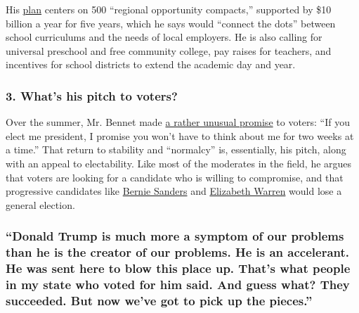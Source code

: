 His \href{https://michaelbennet.com/education/}{plan} centers on 500
``regional opportunity compacts,'' supported by \$10 billion a year for
five years, which he says would ``connect the dots'' between school
curriculums and the needs of local employers. He is also calling for
universal preschool and free community college, pay raises for teachers,
and incentives for school districts to extend the academic day and year.

\hypertarget{3-whats-his-pitch-to-voters}{%
\subsubsection{\texorpdfstring{\textbf{3. What's his pitch to
voters?}}{3. What's his pitch to voters?}}\label{3-whats-his-pitch-to-voters}}

Over the summer, Mr. Bennet made
\href{https://twitter.com/MichaelBennet/status/1158806845953323008}{a
rather unusual promise} to voters: ``If you elect me president, I
promise you won't have to think about me for two weeks at a time.'' That
return to stability and ``normalcy'' is, essentially, his pitch, along
with an appeal to electability. Like most of the moderates in the field,
he argues that voters are looking for a candidate who is willing to
compromise, and that progressive candidates like
\href{https://www.nytimes.com/interactive/2020/us/elections/bernie-sanders.html}{Bernie
Sanders} and
\href{https://www.nytimes.com/interactive/2020/us/elections/elizabeth-warren.html}{Elizabeth
Warren} would lose a general election.

\hypertarget{donald-trump-is-much-more-a-symptom-of-our-problems-than-he-is-the-creator-of-our-problems-he-is-an-accelerant-he-was-sent-here-to-blow-this-place-up-thats-what-people-in-my-state-who-voted-for-him-said-and-guess-what-they-succeeded-but-now-weve-got-to-pick-up-the-pieces}{%
\subsubsection{``Donald Trump is much more a symptom of our problems
than he is the creator of our problems. He is an accelerant. He was sent
here to blow this place up. That's what people in my state who voted for
him said. And guess what? They succeeded. But now we've got to pick up
the
pieces.''}\label{donald-trump-is-much-more-a-symptom-of-our-problems-than-he-is-the-creator-of-our-problems-he-is-an-accelerant-he-was-sent-here-to-blow-this-place-up-thats-what-people-in-my-state-who-voted-for-him-said-and-guess-what-they-succeeded-but-now-weve-got-to-pick-up-the-pieces}}

